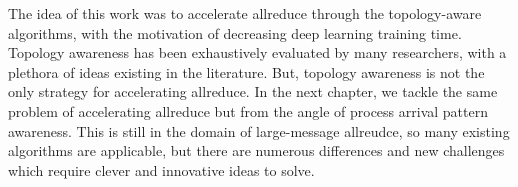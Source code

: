 The idea of this work was to accelerate allreduce through the topology-aware algorithms, with the motivation of decreasing deep learning training time.
Topology awareness has been exhaustively evaluated by many researchers, with a plethora of ideas existing in the literature.
But, topology awareness is not the only strategy for accelerating allreduce.
In the next chapter, we tackle the same problem of accelerating allreduce but from the angle of process arrival pattern awareness.
This is still in the domain of large-message allreudce, so many existing algorithms are applicable, but there are numerous differences and new challenges which require clever and innovative ideas to solve.
